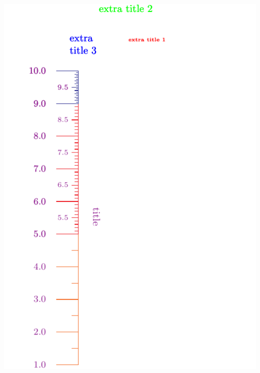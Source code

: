 \documentclass[a4paper,11pt,english]{sphinxmanual}
\begin{document}
\includegraphics{ex_axes_4_1.pdf}
\end{document}
